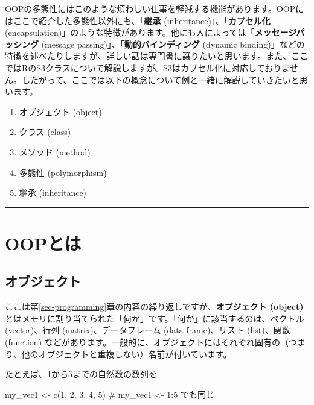 \documentclass[
  a4paper,
  pandoc,
  ja=standard,
  jafont=haranoaji]{bxjsbook}
\newenvironment{Shaded}{\begin{snugshade}}{\end{snugshade}}
\newcommand{\CommentTok}[1]{\textcolor[rgb]{0.37,0.37,0.37}{#1}}
\newcommand{\DecValTok}[1]{\textcolor[rgb]{0.68,0.00,0.00}{#1}}
\newcommand{\FunctionTok}[1]{\textcolor[rgb]{0.28,0.35,0.67}{#1}}
\newcommand{\NormalTok}[1]{\textcolor[rgb]{0.00,0.48,0.65}{#1}}
\newcommand{\OtherTok}[1]{\textcolor[rgb]{0.00,0.48,0.65}{#1}}
\providecommand{\tightlist}{%
  \setlength{\itemsep}{0pt}\setlength{\parskip}{0pt}}
\begin{document}
OOPの多態性にはこのような煩わしい仕事を軽減する機能があります。OOPにはここで紹介した多態性以外にも、「\textbf{継承}
(inheritance)」、「\textbf{カプセル化}
(encapsulation)」のような特徴があります。他にも人によっては「\textbf{メッセージパッシング}
(message passing)」、「\textbf{動的バインディング} (dynamic
binding)」などの特徴を述べたりしますが、詳しい話は専門書に譲りたいと思います。また、ここではRのS3クラスについて解説しますが、S3はカプセル化に対応しておりません。したがって、ここでは以下の概念について例と一緒に解説していきたいと思います。

\begin{enumerate}
\def\labelenumi{\arabic{enumi}.}
\tightlist
\item
  オブジェクト (object)
\item
  クラス (class)
\item
  メソッド (method)
\item
  多態性 (polymorphism)　
\item
  継承 (inheritance)
\end{enumerate}

\begin{center}\rule{0.5\linewidth}{0.5pt}\end{center}

\hypertarget{sec-oop_about_oop}{%
\section{OOPとは}\label{sec-oop_about_oop}}

\hypertarget{ux30aaux30d6ux30b8ux30a7ux30afux30c8-1}{%
\subsection{オブジェクト}\label{ux30aaux30d6ux30b8ux30a7ux30afux30c8-1}}

ここは第\ref{sec-programming}章の内容の繰り返しですが、\textbf{オブジェクト
(object)}
とはメモリに割り当てられた「何か」です。「何か」に該当するのは、ベクトル
(vector)、行列 (matrix)、データフレーム (data frame)、リスト
(list)、関数 (function)
などがあります。一般的に、オブジェクトにはそれぞれ固有の（つまり、他のオブジェクトと重複しない）名前が付いています。

たとえば、1から5までの自然数の数列を

\begin{Shaded}
\begin{Highlighting}[numbers=left,,]
\NormalTok{my\_vec1 }\OtherTok{\textless{}{-}} \FunctionTok{c}\NormalTok{(}\DecValTok{1}\NormalTok{, }\DecValTok{2}\NormalTok{, }\DecValTok{3}\NormalTok{, }\DecValTok{4}\NormalTok{, }\DecValTok{5}\NormalTok{)  }\CommentTok{\# my\_vec1 \textless{}{-} 1:5 でも同じ}
\end{Highlighting}
\end{Shaded}
\end{document}
